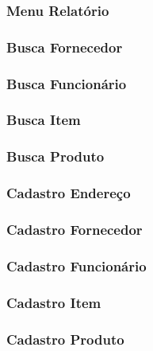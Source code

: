 \subsubsection{Menu Relatório}

\subsubsection{Busca Fornecedor}
%
\subsubsection{Busca Funcionário}
%
\subsubsection{Busca Item}
%
\subsubsection{Busca Produto}

\subsubsection{Cadastro Endereço}

\subsubsection{Cadastro Fornecedor}
%
\subsubsection{Cadastro Funcionário}
%
\subsubsection{Cadastro Item}
%
\subsubsection{Cadastro Produto}
%
